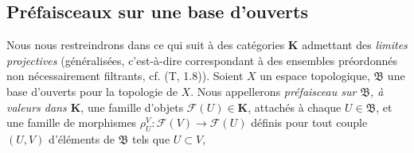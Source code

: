 \subsection{Préfaisceaux sur une base d'ouverts}
\label{subsection:0.3.2-fr}

\begin{env}[3.2.1]
\label{0.3.2.1-fr}
Nous nous restreindrons dans ce qui suit à des catégories $\mathbf{K}$
admettant des \emph{limites projectives} (généralisées, c'est-à-dire
correspondant à des ensembles préordonnés non nécessairement filtrants,
cf. (T, 1.8)). Soient $X$ un espace topologique, $\mathfrak{B}$ une base
d'ouverts pour la topologie de $X$. Nous appellerons \emph{préfaisceau sur
$\mathfrak{B}$, à valeurs dans $\mathbf{K}$}, une famille d'objets
$\mathcal{F}(U)\in\mathbf{K}$, attachés à chaque $U\in\mathfrak{B}$, et une
famille de morphismes
$\rho_U^V:\mathcal{F}(V)\to\mathcal{F}(U)$ définis pour tout couple $(U,V)$
d'éléments de $\mathfrak{B}$ tels que $U\subset V$,



\end{env}
